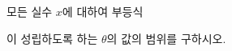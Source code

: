 모든 실수 $x$에 대하여 부등식\par\smallskip{}\par\smallskip\noindent 이 성립하도록 하는 $\theta$의 값의 범위를 구하시오. \dmcondfill{$0\le\theta<2\pi$}{}
